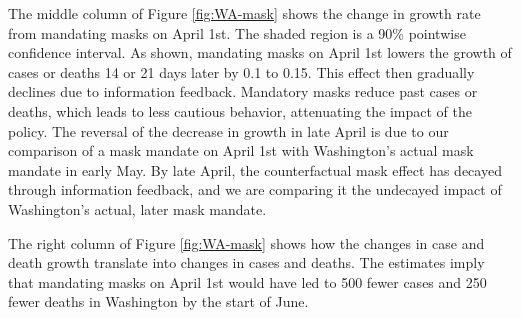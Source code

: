 \documentclass[11pt,reqno,letter]{amsart}
\theoremstyle{definition}
\begin{document}
The middle column of Figure \ref{fig:WA-mask} shows the change in
growth rate from mandating masks on April 1st. The shaded region is a
90\% pointwise confidence interval. As shown, mandating masks on April
1st lowers the growth of cases or deaths 14 or 21 days later by 0.1 to
0.15. This effect then gradually declines due to information
feedback. Mandatory masks reduce past cases or deaths, which leads to
less cautious behavior, attenuating the impact of the policy. The
reversal of the decrease in growth in late April is due to our
comparison of a mask mandate on April 1st with Washington's actual
mask mandate in early May. By late April, the counterfactual mask
effect has decayed through information feedback, and we are comparing
it the undecayed impact of Washington's actual, later mask mandate.

The right column of Figure \ref{fig:WA-mask} shows how the changes in
case and death growth translate into changes in cases and deaths. The
estimates imply that mandating masks on April 1st would have led to
500 fewer cases and 250 fewer deaths in Washington by the start of
June.
\end{document}
